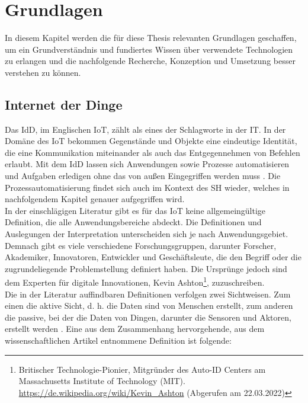 \chapter{Grundlagen}
\label{chap:grundlagen}
    In diesem Kapitel werden die für diese Thesis relevanten Grundlagen geschaffen, um ein Grundverständnis und 
    fundiertes Wissen über verwendete Technologien zu erlangen und die nachfolgende Recherche, Konzeption und 
    Umsetzung besser verstehen zu können. 

\section{Internet der Dinge}
\label{sec:iot}
    Das \ac{IdD}, im Englischen \ac{IoT}, zählt als eines der Schlagworte in der \ac{IT}. In der Domäne des \acs{IoT} bekommen 
    Gegenstände und Objekte eine eindeutige Identität, die eine Kommunikation miteinander als auch das Entgegennehmen von 
    Befehlen erlaubt. Mit dem \acl{IdD} lassen sich Anwendungen sowie Prozesse automatisieren und Aufgaben erledigen ohne das 
    von außen Eingegriffen werden muss \cite{bigdatainsider2016}. Die Prozessautomatisierung findet sich auch im Kontext des 
    \acl{SH} wieder, welches in nachfolgendem Kapitel genauer aufgegriffen wird. 
    \\
    \linebreak
    In der einschlägigen Literatur gibt es für das \acl{IoT} keine allgemeingültige Definition, die alle Anwendungsbereiche abdeckt. 
    Die Definitionen und Auslegungen der Interpretation unterscheiden sich je nach Anwendungsgebiet. Demnach gibt es viele verschiedene 
    Forschungsgruppen, darunter Forscher, Akademiker, Innovatoren, Entwickler und Geschäftsleute, die den Begriff oder die zugrundeliegende 
    Problemstellung definiert haben. Die Ursprünge jedoch sind dem Experten für digitale Innovationen, 
    Kevin Ashton\footnote{Britischer Technologie-Pionier, Mitgründer des Auto-ID Centers am Massachusetts Institute of Technology (MIT). \url{https://de.wikipedia.org/wiki/Kevin_Ashton} (Abgerufen am 22.03.2022)}, 
    zuzuschreiben. 
    \\ 
    Die in der Literatur auffindbaren Definitionen verfolgen zwei Sichtweisen. Zum einen die aktive Sicht, d. h. 
    die Daten sind von Menschen erstellt, zum anderen die passive, bei der die Daten von Dingen, darunter die Sensoren und Aktoren, 
    erstellt werden \cite{Madakam2015}. Eine aus dem Zusammenhang hervorgehende, aus dem wissenschaftlichen Artikel entnommene 
    Definition ist folgende:
